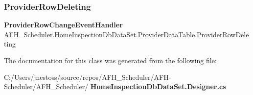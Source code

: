 \subsubsection{ProviderRowDeleting}
{\footnotesize\ttfamily \textbf{ Provider\+Row\+Change\+Event\+Handler} A\+F\+H\+\_\+\+Scheduler.\+Home\+Inspection\+Db\+Data\+Set.\+Provider\+Data\+Table.\+Provider\+Row\+Deleting}



The documentation for this class was generated from the following file\+:\begin{DoxyCompactItemize}
\item 
C\+:/\+Users/jnestoss/source/repos/\+A\+F\+H\+\_\+\+Scheduler/\+A\+F\+H-\/\+Scheduler/\+A\+F\+H\+\_\+\+Scheduler/\textbf{ Home\+Inspection\+Db\+Data\+Set.\+Designer.\+cs}\end{DoxyCompactItemize}

